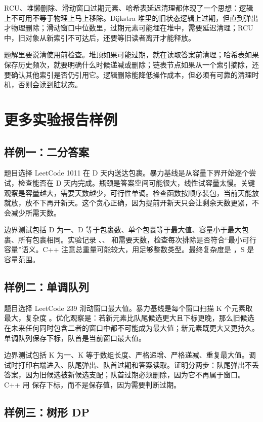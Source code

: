 RCU、堆懒删除、滑动窗口过期元素、哈希表延迟清理都体现了一个思想：逻辑上不可用不等于物理上马上移除。Dijkstra 堆里的旧状态逻辑上过期，但直到弹出才物理删除；滑动窗口中位数里，过期元素可能埋在堆中，需要延迟清理；RCU 中，旧对象从新索引不可达后，还要等旧读者离开才能释放。

题解里要说清使用前检查。堆顶如果可能过期，就在读取答案前清理；哈希表如果保存历史频次，就要明确什么时候递减或删除；链表节点如果从一个索引摘除，还要确认其他索引是否仍引用它。逻辑删除能降低操作成本，但必须有可靠的清理时机，否则会读到脏状态。

\section{更多实验报告样例}

\subsection{样例一：二分答案}

题目选择 LeetCode 1011 在 D 天内送达包裹。暴力基线是从容量下界开始逐个尝试，检查能否在 D 天内完成。瓶颈是答案空间可能很大，线性试容量太慢。关键观察是容量越大，需要天数越少，可行性单调。检查函数按顺序装包，当前天能放就放，放不下再开新天。这个贪心正确，因为提前开新天只会让剩余天数更紧，不会减少所需天数。

边界测试包括 D 为一、D 等于包裹数、单个包裹等于最大值、容量小于最大包裹、所有包裹相同。实验记录 、、 和需要天数，检查每次排除是否符合“最小可行容量”语义。C++ 注意总重量可能较大，用足够整数类型。最终复杂度是 ，S 是容量范围。

\subsection{样例二：单调队列}

题目选择 LeetCode 239 滑动窗口最大值。暴力基线是每个窗口扫描 K 个元素取最大，复杂度 。优化观察是：若新元素比队尾候选更大且下标更晚，那么旧候选在未来任何同时包含二者的窗口中都不可能成为最大值；新元素既更大又更持久。单调队列保存下标，队首是当前窗口最大值。

边界测试包括 K 为一、K 等于数组长度、严格递增、严格递减、重复最大值。调试时打印右端进入、队尾弹出、队首过期和答案读取。证明分两步：队尾弹出不丢答案，因为旧候选被新候选支配；队首过期必须删除，因为它不再属于窗口。C++ 用  保存下标，而不是保存值，因为需要判断过期。

\subsection{样例三：树形 DP}

